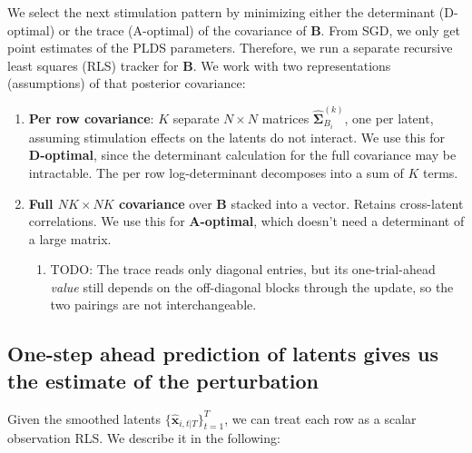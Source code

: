 \documentclass[11pt,letterpaper]{article} %
\begin{document}
We select the next stimulation pattern by minimizing either the determinant (D-optimal) or the trace (A-optimal) of the covariance of $\bm{B}$. From SGD, we only get point estimates of the PLDS parameters. Therefore, we run a separate recursive least squares (RLS) tracker for $\bm{B}$. We work with two representations (assumptions) of that posterior covariance:
\begin{enumerate}
    \item \textbf{Per row covariance}: $K$ separate $N\times N$ matrices $\hat{\bm{\Sigma}}_{B_i}^{(k)}$, one per latent, assuming stimulation effects on the latents do not interact. We use this for \textbf{D-optimal}, since the determinant calculation for the full covariance may be intractable. The per row log-determinant decomposes into a sum of $K$ terms.
    \item \textbf{Full $NK\times NK$ covariance} over $\bm{B}$ stacked into a vector. Retains cross-latent correlations. We use this for \textbf{A-optimal}, which doesn't need a determinant of a
    large matrix.
    \begin{enumerate}
        \item TODO: The trace reads only diagonal entries, but its one-trial-ahead \emph{value} still depends on the off-diagonal blocks through the update, so the two pairings are not interchangeable.
    \end{enumerate}
\end{enumerate}


\subsection*{One-step ahead prediction of latents gives us the estimate of the perturbation}

Given the smoothed latents $\{\hat{\bm{x}}_{i,t|T}\}_{t=1}^T$, we can treat each row as a scalar observation RLS. We describe it in the following: 
\end{document}
